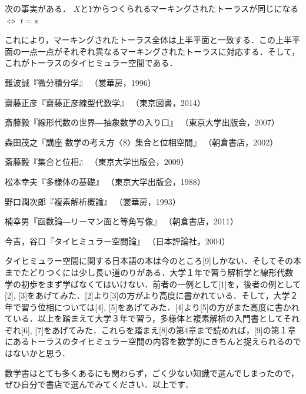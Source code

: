 次の事実がある．
\thm
$X$と$Y$からつくられるマーキングされたトーラスが同じになる\\
$\Leftrightarrow $ $t=s$
\thmx
\begin{center}
\end{center}
これにより，マーキングされたトーラス全体は上半平面と一致する．この上半平面の一点一点がそれぞれ異なるマーキングされたトーラスに対応する．そして，これがトーラスのタイヒミュラー空間である．
\begin{thebibliography}{9}
\item
難波誠『微分積分学』
（裳華房，1996）
\item
齋藤正彦『齋藤正彦線型代数学』
（東京図書，2014）
\item
斎藤毅『線形代数の世界―抽象数学の入り口』
（東京大学出版会，2007）
\item
森田茂之『講座 数学の考え方〈8〉集合と位相空間』
（朝倉書店，2002）
\item
斎藤毅『集合と位相』
（東京大学出版会，2009）
\item
松本幸夫『多様体の基礎』
（東京大学出版会，1988）
\item
野口潤次郎『複素解析概論』
（裳華房，1993）
\item
楠幸男『函数論―リーマン面と等角写像』
（朝倉書店，2011）
\item
今吉，谷口『タイヒミュラー空間論』
（日本評論社，2004）
\end{thebibliography}

タイヒミュラー空間に関する日本語の本は今のところ[9]しかない．そしてその本までたどりつくには少し長い道のりがある．大学１年で習う解析学と線形代数学の初歩をまず学ばなくてはいけない．前者の一例として[1]を，後者の例として[2], [3]をあげてみた．[2]より[3]の方がより高度に書かれている．そして，大学２年で習う位相については[4], [5]をあげてみた．[4]より[5]の方がまた高度に書かれている．以上を踏まえて大学３年で習う，多様体と複素解析の入門書としてそれぞれ[6], [7]をあげてみた．これらを踏まえ[8]の第4章まで読めれば，[9]の第１章にあるトーラスのタイヒミュラー空間の内容を数学的にきちんと捉えられるのではないかと思う．

数学書はとても多くあるにも関わらず，ごく少ない知識で選んでしまったので，ぜひ自分で書店で選んでみてください．以上です．







